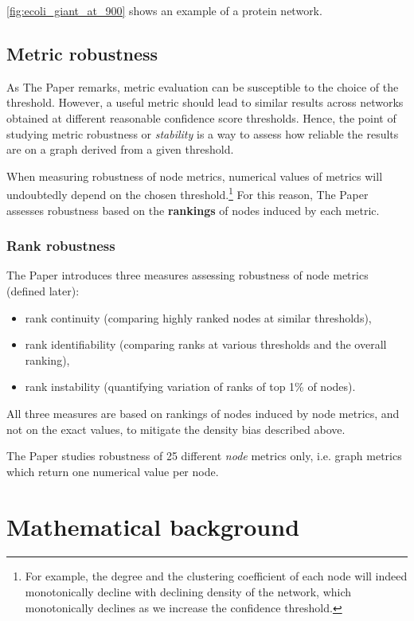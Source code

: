 \autoref{fig:ecoli_giant_at_900} shows an example of a protein network.

\subsection{Metric robustness}

As The Paper remarks, metric evaluation can be susceptible to the choice of the threshold.
However, a useful metric should lead to similar results across networks obtained at different reasonable confidence score thresholds.
Hence, the point of studying metric robustness or \textsl{stability} is a way to assess how reliable the results are on a graph derived from a given threshold.

When measuring robustness of node metrics, numerical values of metrics will undoubtedly depend on the chosen threshold.\footnote{For example, the degree and the clustering coefficient of each node will indeed monotonically decline with declining density of the network, which monotonically declines as we increase the confidence threshold.}
For this reason, The Paper assesses robustness based on the \textbf{rankings} of nodes induced by each metric.

\subsubsection*{Rank robustness}

The Paper introduces three measures assessing robustness of node metrics (defined later):
\begin{itemize}[topsep=5pt]
    \item rank continuity (comparing highly ranked nodes at similar thresholds),
    \item rank identifiability (comparing ranks at various thresholds and the overall ranking),
    \item rank instability (quantifying variation of ranks of top 1\% of nodes).
\end{itemize}
All three measures are based on rankings of nodes induced by node metrics, and not on the exact values, to mitigate the density bias described above.

The Paper studies robustness of 25 different \textsl{node} metrics only, i.e. graph metrics which return one numerical value per node.


\section{Mathematical background}\label{sec:math_background}

